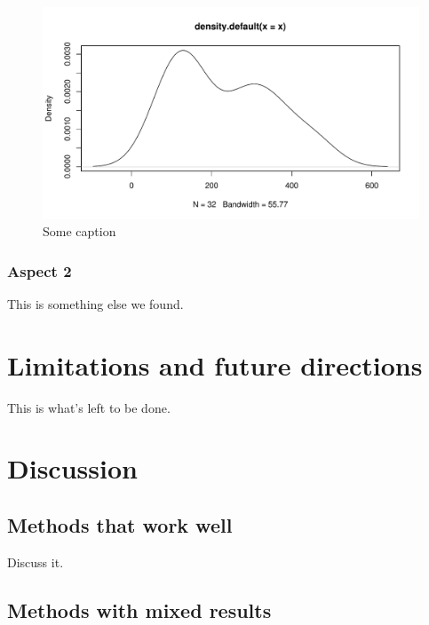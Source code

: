 \documentclass[a4paper,doc,floatsintext,natbib]{apa6}\usepackage[]{graphicx}\usepackage[]{xcolor}
\makeatletter
\def\maxwidth{ %
  \ifdim\Gin@nat@width>\linewidth
    \linewidth
  \else
    \Gin@nat@width
  \fi
}
\newenvironment{knitrout}{}{} %
\makeatother
\begin{document}
	\begin{figure}
	\centering
\begin{knitrout}
\color{fgcolor}

{\centering \includegraphics[width=\maxwidth]{figure/plot-pdf-1} 

}


\end{knitrout}
		\caption{\label{fig:dist} Some caption }
	\end{figure}

\subsubsection{Aspect 2}

	This is something else we found.
    
\section{Limitations and future directions}

	This is what's left to be done.
    
\section{Discussion}

\subsection{Methods that work well}

	Discuss it.

\subsection{Methods with mixed results}
\end{document}

